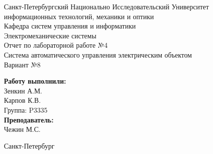 \begin{titlepage}	%

	\begin{center}		%

		\large Санкт-Петербургский Национально Исследовательский Университет\\
		\large информационных технологий, механики и оптики \\
		\large Кафедра систем управления и информатики\\[6cm]
		
		\huge Электромеханические системы\\[0.5cm] %
		\large Отчет по лабораторной работе №4\\[0.1cm]
		\large Система автоматического управления электрическим объектом\\[0.5cm]
		\large Вариант №8\\[5cm]

	\end{center}


	\begin{flushright} %
		\begin{minipage}{0.25\textwidth} %
			\begin{flushleft} %

				\large\textbf{Работу выполнили:}\\
				\large Зенкин А.М.\\
				\large Карпов К.В.\\
				\large {Группа:} P3335\\
				
				\large \textbf{Преподаватель:}\\
				\large Чежин М.С.

			\end{flushleft}
		\end{minipage}
	\end{flushright}
	
	\vfill %

	\begin{center}
	\large Санкт-Петербург\\
	\large \the\year %
	\end{center} %

\thispagestyle{empty} %
\end{titlepage} %

\vfill %

